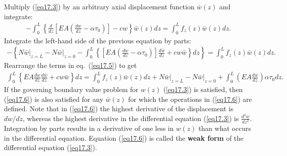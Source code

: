 \documentclass{AeroStructure-ERJohnson}
\begin{document}
Multiply (\ref{eq17.3}) by an arbitrary axial displacement function $\bar{w}(z)$ and integrate:
\begin{align}\label{eq17.4}
-\int_{0}^{L}\left\{\frac{d}{d z}\left[E A\left(\frac{d w}{d z}-\alpha \tau_{0}\right)\right]-c w\right\} \bar{w}(z) d z=\int_{0}^{L} f_{z}(z) \bar{w}(z) d z.
\end{align}
Integrate the left-hand side of the previous equation by parts:
\begin{align}\label{eq17.5}
-\left\{\left.N \bar{w}\right|_{z=L}-\left.N \bar{w}\right|_{z=0}-\int_{0}^{L}\left\{\left[E A\left(\frac{d w}{d z}-\alpha \tau_{0}\right)\right] \frac{d \bar{w}}{d z}+c w \bar{w}\right\} d z\right\}=\int_{0}^{L} f_{z}(z) \bar{w}(z) d z.
\end{align}
Rearrange the terms in eq.~(\ref{eq17.5}) to get
\begin{align}\label{eq17.6}
\int_{0}^{L}\left\{E A \frac{d w}{d z} \frac{d \bar{w}}{d z}+c w \bar{w}\right\} d z=\int_{0}^{L} f_{z}(z) \bar{w}(z) d z+\left.N \bar{w}\right|_{z=L}-\left.N \bar{w}\right|_{z=0}+\int_{0}^{L}\left(E A \frac{d \bar{w}}{d z}\right) \alpha \tau_{0} d z.
\end{align}
If the governing boundary value problem for $w(z)$ (\ref{eq17.3}) is satisfied, then (\ref{eq17.6}) is also satisfied for any $\bar{w}(z)$ for which the operations in (\ref{eq17.6}) are defined. Note that in (\ref{eq17.6}) the highest derivative of the displacement is $d w/d z$, whereas the highest derivative in the differential equation (\ref{eq17.3}) is $\frac{d^{2} w}{d z^{2}}$. Integration by parts results in a derivative of one less in $w(z)$ than what occurs in the differential equation. Equation (\ref{eq17.6}) is called the \textbf{weak form} of the differential equation (\ref{eq17.3}).

\enlargethispage{-1\baselineskip}
\end{document}
